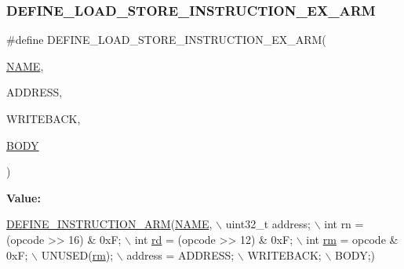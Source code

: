 \subsubsection{\texorpdfstring{D\+E\+F\+I\+N\+E\+\_\+\+L\+O\+A\+D\+\_\+\+S\+T\+O\+R\+E\+\_\+\+I\+N\+S\+T\+R\+U\+C\+T\+I\+O\+N\+\_\+\+E\+X\+\_\+\+A\+RM}{DEFINE\_LOAD\_STORE\_INSTRUCTION\_EX\_ARM}}
{\footnotesize\ttfamily \#define D\+E\+F\+I\+N\+E\+\_\+\+L\+O\+A\+D\+\_\+\+S\+T\+O\+R\+E\+\_\+\+I\+N\+S\+T\+R\+U\+C\+T\+I\+O\+N\+\_\+\+E\+X\+\_\+\+A\+RM(\begin{DoxyParamCaption}\item[{}]{\mbox{\hyperlink{inflate_8h_a164ea0159d5f0b5f12a646f25f99eceaa67bc2ced260a8e43805d2480a785d312}{N\+A\+ME}},  }\item[{}]{A\+D\+D\+R\+E\+SS,  }\item[{}]{W\+R\+I\+T\+E\+B\+A\+CK,  }\item[{}]{\mbox{\hyperlink{gzlog_8c_aa6bdf6a6d9916c343e1e17774d84a156}{B\+O\+DY}} }\end{DoxyParamCaption})}

{\bfseries Value\+:}
\begin{DoxyCode}
\mbox{\hyperlink{isa-arm_8c_a56ae89d1d9edfe3d78f30c0a60273883}{DEFINE\_INSTRUCTION\_ARM}}(\mbox{\hyperlink{inflate_8h_a164ea0159d5f0b5f12a646f25f99eceaa67bc2ced260a8e43805d2480a785d312}{NAME}}, \(\backslash\)
        uint32\_t address; \(\backslash\)
        int rn = (opcode >> 16) & 0xF; \(\backslash\)
        int \mbox{\hyperlink{isa-arm_8c_a555541ce18ed9b5fad657a06b22cb465}{rd}} = (opcode >> 12) & 0xF; \(\backslash\)
        int \mbox{\hyperlink{isa-thumb_8c_a20e40d2fb8c51fa4dd2b4449ad32e111}{rm}} = opcode & 0xF; \(\backslash\)
        UNUSED(\mbox{\hyperlink{isa-thumb_8c_a20e40d2fb8c51fa4dd2b4449ad32e111}{rm}}); \(\backslash\)
        address = ADDRESS; \(\backslash\)
        WRITEBACK; \(\backslash\)
        BODY;)
\end{DoxyCode}
\mbox{\label{isa-arm_8c_a566d428e5e9b821adeab6881cad8e100}} 
